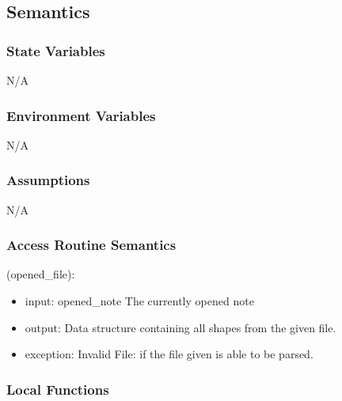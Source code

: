 \documentclass[12pt, titlepage]{article}
\begin{document}
\subsection{Semantics}

\subsubsection{State Variables}
N/A

\subsubsection{Environment Variables}
%
N/A

\subsubsection{Assumptions}
N/A

\subsubsection{Access Routine Semantics}

(opened\_file):
\begin{itemize}
\item input: opened\_note The currently opened note
\item output: Data structure containing all shapes from the given file.
\item exception: Invalid File: if the file given is able to be parsed.
\end{itemize}

%

\subsubsection{Local Functions}
\end{document}
